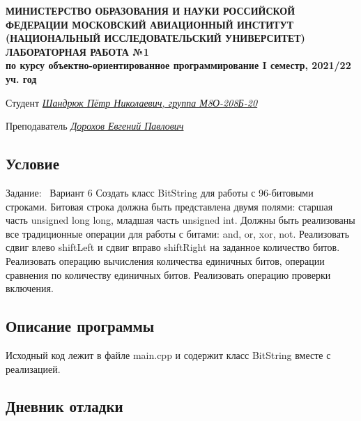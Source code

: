 \documentclass[12pt]{article}
\begin{document}
\begin{titlepage}
\begin{center}
\textbf{МИНИСТЕРСТВО ОБРАЗОВАНИЯ И НАУКИ РОССИЙСКОЙ ФЕДЕРАЦИИ
\medskip
МОСКОВСКИЙ АВИАЦИОННЫЙ ИНСТИТУТ
(НАЦИОНАЛЬНЫЙ ИССЛЕДОВАТЕЛЬСКИЙ УНИВЕРСИТЕТ)
\vfill\vfill
{\Huge ЛАБОРАТОРНАЯ РАБОТА №1} \\
по курсу объектно-ориентированное программирование
I семестр, 2021/22 уч. год}
\end{center}
\vfill

Студент \uline{\it {Шандрюк Пётр Николаевич, группа М8О-208Б-20}\hfill}

Преподаватель \uline{\it {Дорохов Евгений Павлович}\hfill}

\vfill
\end{titlepage}

\subsection*{Условие}

Задание: \
Вариант 6
Создать класс BitString для работы с 96-битовыми строками. Битовая
строка должна быть представлена двумя полями: старшая часть unsigned
long long, младшая часть unsigned int. Должны быть реализованы все
традиционные операции для работы с битами: and, or, xor, not. Реализовать
сдвиг влево shiftLeft и сдвиг вправо shiftRight на заданное количество битов.
Реализовать операцию вычисления количества единичных битов, операции
сравнения по количеству единичных битов. Реализовать операцию проверки
включения.

\subsection*{Описание программы}

Исходный код лежит в файле main.cpp и содержит класс BitString вместе с реализацией.


\subsection*{Дневник отладки}
\end{document}
